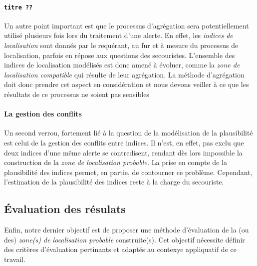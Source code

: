 \paragraph{\texttt{titre ??}}


Un autre point important est que le processus d'agrégation sera
potentiellement utilisé plusieurs fois lors du traitement d'une
alerte. En effet, les \emph{indices de localisation} sont donnés par
le requérant, au fur et à mesure du processus de localisation, parfois
en répose aux questions des secouristes. L'ensemble des indices de
localisation modélisés est donc amené à évoluer, comme la \emph{zone
  de localisation compatible} qui résulte de leur agrégation. La
méthode d’agrégation doit donc prendre cet aspect en considération et
nous devons veiller à ce que les résultats de ce processus ne soient
pas sensibles


\paragraph{La gestion des conflits}


Un second verrou, fortement lié à la question de la modélisation de la
plausibilité est celui de la gestion des conflits entre indices. Il
n'est, en effet, pas exclu que deux indices d'une même alerte se
contredisent, rendant dès lors impossible la construction de la
\emph{zone de localisation probable.} La prise en compte de la
plausibilité des indices permet, en partie, de contourner ce
problème. Cependant, l'estimation de la plausibilité des indices reste
à la charge du secouriste.



\subsection{Évaluation des résulats}
\label{subsec:2-1-5}

Enfin, notre dernier objectif est de proposer une méthode d'évaluation
de la (ou des) \emph{zone(s) de localisation probable}  construite(s). Cet
objectif nécessite définir des critères d'évaluation pertinants et
adaptés au contexye appliquatif de ce travail.


